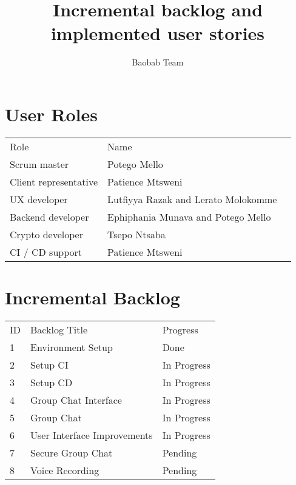 \documentclass[a4paper]{article}
\title{ Incremental backlog and implemented user stories}
\author{Baobab Team}
\begin{document}
\newpage


\newpage

\section{User Roles}

\setlength{\arrayrulewidth}{0.5mm}
\setlength{\tabcolsep}{12pt}
\renewcommand{\arraystretch}{2} 
\begin{tabular}{ |p{3cm}|p{3cm}|p{3cm}|  }
\hline
\rowcolor{lightgray}\multicolumn{2}{|c|}{Scrum User Roles} \\
\hline
Role & Name\\
\hline
Scrum master  & Potego Mello\\ \hline 
Client representative  & Patience Mtsweni\\ \hline 
UX developer  & Lutfiyya Razak and Lerato Molokomme\\ \hline 
Backend developer  & Ephiphania Munava and Potego Mello\\ \hline 
Crypto developer  & Tsepo Ntsaba \\ \hline 
CI / CD support  & Patience Mtsweni \\ 
\hline
\end{tabular}
\newpage

\section{Incremental Backlog}

\setlength{\arrayrulewidth}{0.5mm}
\setlength{\tabcolsep}{12pt}
\renewcommand{\arraystretch}{2} 
\begin{tabular}{ |p{3cm}|p{3cm}|p{3cm}|  }
\hline
\rowcolor{lightgray}\multicolumn{3}{|c|}{Backlog} \\
\hline
ID & Backlog Title & Progress\\
\hline
1 & Environment Setup & Done\\
\hline
2 & Setup CI & In Progress\\
\hline
3 & Setup CD & In Progress\\
\hline
4 & Group Chat Interface & In Progress\\
\hline
5 & Group Chat & In Progress\\
\hline
6 & User Interface Improvements & In Progress\\
\hline
7 & Secure Group Chat & Pending\\
\hline
8 & Voice Recording & Pending\\
\hline
\end{tabular}
\end{document}
